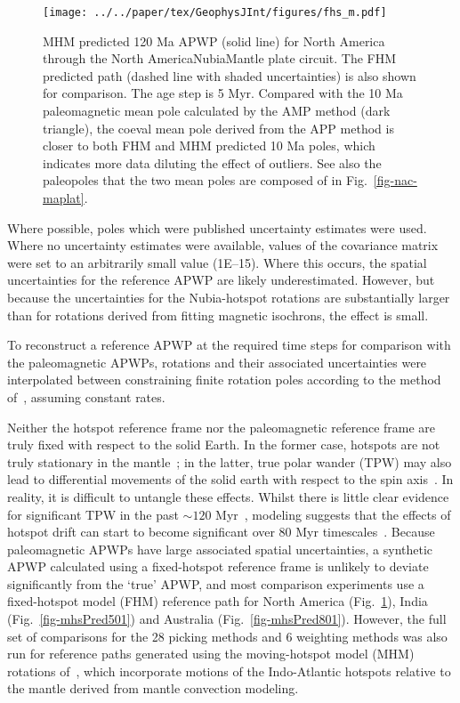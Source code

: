 \begin{figure}[!ht]
  \centering
  \texttt{[image: ../../paper/tex/GeophysJInt/figures/fhs\_m.pdf]}
  \caption[120 Ma MHM vs FHM predicted APWP of North America]{MHM
predicted 120 Ma APWP (solid line) for North America through the
North America\textendash{}Nubia\textendash{}Mantle plate circuit. The FHM
predicted path (dashed line with shaded uncertainties) is also shown for
comparison. The age step is 5 Myr. Compared with the 10 Ma paleomagnetic mean
pole calculated by the AMP method (dark triangle), the coeval mean pole derived
from the APP method is closer to both FHM and MHM predicted 10 Ma poles, which
indicates more data diluting the effect of outliers. See also the paleopoles
that the two mean poles are composed of in
Fig.~\ref{fig-nac-maplat}.}\label{fig-mhsPred}
\end{figure}

Where possible, poles which were published uncertainty estimates were used.
Where no uncertainty estimates were available, values of the covariance matrix
were set to an arbitrarily small value (1E–15). Where this occurs, the spatial
uncertainties for the reference APWP are likely underestimated. However, but
because the uncertainties for the Nubia-hotspot rotations are substantially
larger than for rotations derived from fitting magnetic isochrons, the effect is
small.

To reconstruct a reference APWP at the required time steps for comparison with
the paleomagnetic APWPs, rotations and their associated uncertainties were
interpolated between constraining finite rotation poles according to the method
of~\citet{D08}, assuming constant rates.

Neither the hotspot reference frame nor the paleomagnetic reference frame are
truly fixed with respect to the solid Earth. In the former case, hotspots are
not truly stationary in the mantle~\citep{S98}; in the latter, true polar wander
(TPW) may also lead to differential movements of the solid earth with respect to
the spin axis~\citep{E03}. In reality, it is difficult to untangle these
effects. Whilst there is little clear evidence for significant TPW in the past
${\sim}120$ Myr~\citep{C00,R04}, modeling suggests that the effects of hotspot
drift can start to become significant over 80 Myr
timescales~\citep{O05}. Because paleomagnetic APWPs have large associated
spatial uncertainties, a synthetic APWP calculated using a fixed-hotspot
reference frame is unlikely to deviate significantly from the `true' APWP, and
most comparison experiments use a fixed-hotspot model (FHM) reference path for
North America (Fig.~\ref{fig-mhsPred}), India (Fig.~\ref{fig-mhsPred501}) and
Australia (Fig.~\ref{fig-mhsPred801}). However, the full set of comparisons for
the 28 picking methods and 6 weighting methods was also run for reference paths
generated using the moving-hotspot model (MHM) rotations of~\citet{O05}, which
incorporate motions of the Indo-Atlantic hotspots relative to the mantle derived
from mantle convection modeling.

